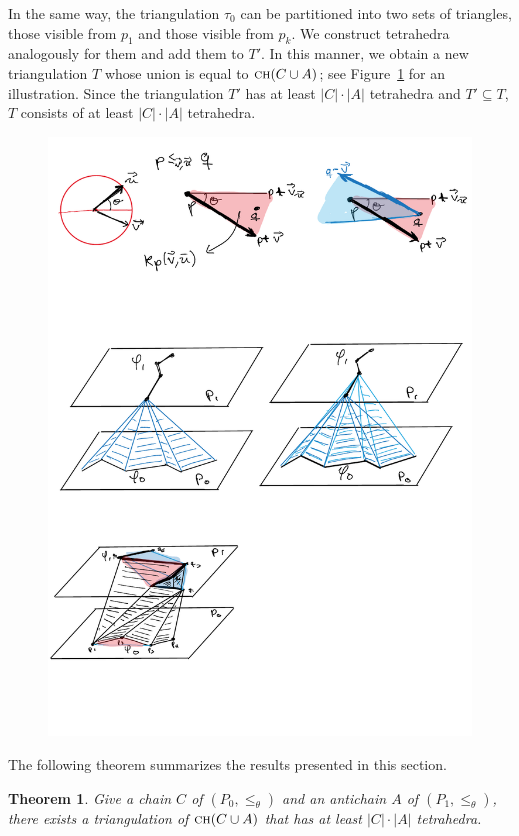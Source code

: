 \documentclass[a4paper, 11pt]{article}
\newtheorem{theorem}{Theorem}[section]
\newcommand{\ch}[1]{\ensuremath{\textsc{ch}(#1)}}
\newcommand{\lt}{\ensuremath{ \leq_{\theta}}}
\begin{document}
In the same way, the triangulation $\tau_0$ can be partitioned into two sets of triangles, those visible from $p_1$ and those visible from $p_k$. We construct tetrahedra analogously for them and add them to $T'$.
In this manner, we obtain a new triangulation $T$ whose union is equal to $\ch{C\cup A}$; see Figure~\ref{fig:CompleteTriangulation} for an illustration.
Since the triangulation $T'$ has at least $|C|\cdot |A|$ tetrahedra and $T'\subseteq T$, $T$ consists of at least $|C|\cdot |A|$ tetrahedra.

\begin{figure}[tb]
\centering
\includegraphics[width=1\textwidth]{img/CompleteTriangulation.pdf}
\caption{\small }
\label{fig:CompleteTriangulation}
\end{figure}
The following theorem summarizes the results presented in this section. 

\begin{theorem}\label{thm:Quadratic size Triangulation}
Give a chain $C$ of $(P_0, \lt)$ and  an antichain $A$ of $(P_1, \lt)$,
there exists a triangulation of $\ch{C\cup A}$ that has at least $|C|\cdot |A|$ tetrahedra.
\end{theorem}
\end{document}
